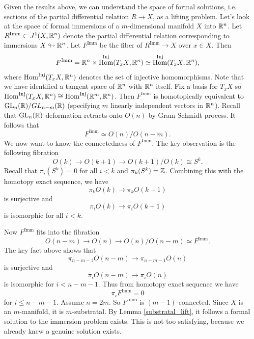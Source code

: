 \documentclass{article}
\newtheorem{proposed work}[theorem]{Proposed Work}
\theoremstyle{definition}
\DeclareMathOperator{\Hom}{Hom}
\DeclareMathOperator{\Imm}{Imm}
\DeclareMathOperator{\GL}{GL}
\begin{document}
Given the results above, we can understand the space of formal solutions, i.e. sections of the partial differential relation $R\to X$, as a lifting problem. Let's look at the space of formal immersions of a $m$-dimensional manifold $X$ into $\mathbb R^n$. Let $R^{\Imm} \subset J^1(X,\R^n)$ denote the partial differential relation corresponding to immersions $X\looparrowright \mathbb R^n$. Let $F^{\Imm}$ be the fiber of $R^{\Imm}\to X$ over $x \in X$. Then
\begin{equation*}
F^{\Imm} = \R^n \times \Hom^{\mathrm{Inj}}(T_xX,\R^n) \simeq \Hom^{\mathrm{Inj}}(T_xX,\R^n),
\end{equation*}
where $\Hom^{\mathrm{Inj}}(T_xX,\R^n)$ denotes the set of injective homomorphisms. Note that we have identified a tangent space of $\mathbb R^n$ with $\mathbb R^n$ itself. Fix a basis for $T_xX$ so $\Hom^{\mathrm{Inj}}(T_xX,\R^n) \cong \Hom^{\mathrm{Inj}}(\R^m,\R^n)$. Then $F^{\Imm}$ is homotopically equivalent to $\GL_n(\R)/GL_{n-m}(\R)$ (specifying $m$ linearly independent vectors in $\mathbb R^n$). Recall that $\GL_n(\R)$ deformation retracts onto $O(n)$ by Gram-Schmidt process. It follows that
\begin{equation*}
F^{\Imm} \simeq O(n)/O(n-m).
\end{equation*}
We now want to know the connectedness of $F^{\Imm}$. The key observation is the following fibration
\begin{equation*}
O(k)\to O(k+1) \to O(k+1)/O(k) \cong S^k.
\end{equation*}
Recall that $\pi_i(S^k) = 0$ for all $i <k$ and $\pi_k(S^k) = \mathbb Z$. Combining this with the homotopy exact sequence, we have
\begin{equation*}
\pi_k O(k) \to \pi_k O(k+1)
\end{equation*}
is surjective and
\begin{equation*}
\pi_i O(k) \to \pi_i O(k+1)
\end{equation*}
is isomorphic for all $i < k$.

Now $F^{\Imm}$ fits into the fibration
\begin{equation*}
O(n-m)\to O(n) \to O(n)/O(n-m) \simeq F^{\Imm}.
\end{equation*}
The key fact above shows that
\begin{equation*}
\pi_{n-m-1}O(n-m)\to\pi_{n-m-1}O(n)
\end{equation*}
is surjective and
\begin{equation*}
\pi_{i}O(n-m)\to\pi_{i}O(n)
\end{equation*}
is isomorphic for $i < n-m-1$. Thus from homotopy exact sequence we have
\begin{equation*}
\pi_iF^{\Imm} = 0
\end{equation*}
for $i \le n-m-1$. Assume $n=2m$. So $F^{\Imm}$ is $(m-1)$-connected. Since $X$ is an $m$-manifold, it is $m$-substratal. By Lemma \ref{substratal_lift}, it follows a formal solution to the immersion problem exists. This is not too satisfying, because we already knew a genuine solution exists.
\end{document}
